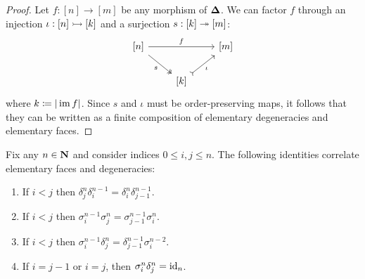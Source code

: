 \begin{proof}
Let \(f: [n] \to [m]\) be any morphism of \({\mathbf{\Delta}}\). We can factor \(f\) through
an injection \(\iota: [n] \rightarrowtail [k]\) and a surjection \(s: [k] \twoheadrightarrow [m]\):
\[
\begin{tikzcd}
{[n]} \ar[rr, "f"] \ar[dr, two heads, "s"'] &&{[m]} \\
&{[k]} \ar[ru, tail, "\iota"'] &
\end{tikzcd}
\]
where \(k \coloneq |\operatorname{im} f|\). Since \(s\) and \(\iota\) must be order-preserving
maps, it follows that they can be written as a finite composition of elementary
degeneracies and elementary faces.
\end{proof}

\begin{corollary}
\label{cor:cosimplicial-identities}
Fix any \(n \in \mathbf{N}\) and consider indices \(0 \leq i, j \leq n\). The following
identities correlate elementary faces and degeneracies:
\begin{enumerate}[(1)]\setlength\itemsep{0em}
\item If \(i < j\) then
  \(\delta_j^n \delta_i^{n-1} = \delta_i^n \delta_{j-1}^{n-1}\).

\item If \(i < j\) then
  \(\sigma_i^{n-1} \sigma_j^n = \sigma_{j-1}^{n-1} \sigma_i^n \).

\item If \(i < j\) then
  \(\sigma_i^{n-1} \delta_j^n = \delta_{j-1}^{n-1} \sigma_i^{n-2}\).

\item If \(i = j - 1\) or \(i = j\), then \(\sigma_i^n \delta_j^n = \operatorname{id}_n\).


\end{enumerate}
\end{corollary}
